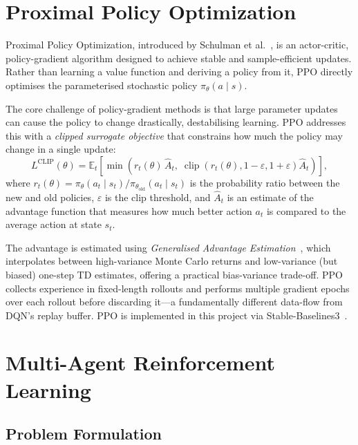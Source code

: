 \section{Proximal Policy Optimization}

Proximal Policy Optimization, introduced by Schulman et
al.~\cite{schulman2017ppo}, is an actor-critic, policy-gradient algorithm designed
to achieve stable and sample-efficient updates. Rather than learning a value
function and deriving a policy from it, PPO directly optimises the parameterised
stochastic policy $\pi_\theta(a \mid s)$.

The core challenge of policy-gradient methods is that large parameter updates can
cause the policy to change drastically, destabilising learning. PPO addresses this
with a \textit{clipped surrogate objective} that constrains how much the policy may
change in a single update:
\[
  L^{\text{CLIP}}(\theta) = \mathbb{E}_t\!\left[
    \min\!\left(
      r_t(\theta)\,\hat{A}_t,\;
      \operatorname{clip}\!\left(r_t(\theta), 1-\varepsilon, 1+\varepsilon\right)
      \hat{A}_t
    \right)
  \right],
\]
where $r_t(\theta) = \pi_\theta(a_t \mid s_t)/\pi_{\theta_{\text{old}}}(a_t \mid
s_t)$ is the probability ratio between the new and old policies, $\varepsilon$ is
the clip threshold, and $\hat{A}_t$ is an estimate of the advantage function that
measures how much better action $a_t$ is compared to the average action at state
$s_t$.

The advantage is estimated using \textit{Generalised Advantage Estimation}~\cite{schulman2017ppo}, which interpolates between high-variance Monte Carlo
returns and low-variance (but biased) one-step TD estimates, offering a practical
bias-variance trade-off. PPO collects experience in fixed-length rollouts and
performs multiple gradient epochs over each rollout before discarding it---a
fundamentally different data-flow from DQN's replay buffer. PPO is implemented in
this project via Stable-Baselines3~\cite{raffin2021sb3}.

\section{Multi-Agent Reinforcement Learning}

\subsection{Problem Formulation}

